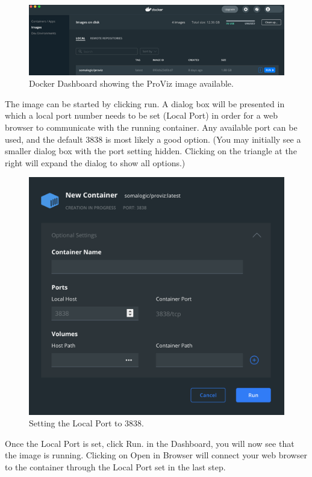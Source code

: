 \documentclass[
]{book}
\begin{document}
\begin{figure}
\centering
\includegraphics{images/Dashboard.png}
\caption{Docker Dashboard showing the ProViz image available.}
\end{figure}

The image can be started by clicking run. A dialog box will be presented in which a local port number needs to be set (Local Port) in order for a web browser to communicate with the running container. Any available port can be used, and the default 3838 is most likely a good option. (You may initially see a smaller dialog box with the port setting hidden. Clicking on the triangle at the right will expand the dialog to show all options.)

\begin{figure}
\centering
\includegraphics{images/Dashboard_port.png}
\caption{Setting the Local Port to 3838.}
\end{figure}

Once the Local Port is set, click Run. in the Dashboard, you will now see that the image is running. Clicking on Open in Browser will connect your web browser to the container through the Local Port set in the last step.
\end{document}
